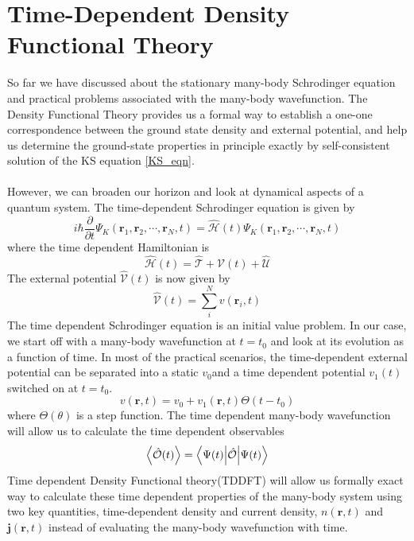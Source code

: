 \section{Time-Dependent Density Functional Theory}
So far we have discussed about the stationary many-body Schrodinger equation and practical problems associated with the many-body wavefunction. The Density Functional Theory provides us a formal way to establish a one-one correspondence between the ground state density and external potential, and help us determine the ground-state properties in principle exactly by self-consistent solution of the KS equation \eqref{KS_eqn}. \\ \\ 
However, we can broaden our horizon and look at dynamical aspects of a quantum system. The time-dependent Schrodinger equation is given by \begin{equation}\label{td_schrodinger_eqn1}
    i\hbar \frac{\partial}{\partial t}\Psi_K(\mathbf{r}_1,\mathbf{r}_2,\cdots,\mathbf{r}_N,t) = \hat{\mathcal{H}}(t)\Psi_K(\mathbf{r}_1,\mathbf{r}_2,\cdots,\mathbf{r}_N,t)
\end{equation}
where the time dependent Hamiltonian is 
\begin{equation}
    \hat{\mathcal{H}}(t) = \hat{\mathcal{T}} + \hat{\mathcal{V}}(t) + \hat{\mathcal{U}}
\end{equation}
The external potential $\hat{\mathcal{V}}(t)$ is now given by
\begin{equation}
    \hat{\mathcal{V}}(t) = \sum_i^{N}v(\mathbf{r}_i,t)
\end{equation}
The time dependent Schrodinger equation is an initial value problem. In our case, we start off with a many-body wavefunction at $t=t_0$ and look at its evolution as a function of time. In most of the practical scenarios, the time-dependent external potential can be separated into a static $v_0$and a time dependent potential $v_1(t)$ switched on at $t=t_0$. 
\begin{equation}
    v(\mathbf{r},t) = v_0 + v_1(\mathbf{r},t)\Theta(t-t_0)
\end{equation}
where $\Theta(\theta)$ is a step function. The time dependent many-body wavefunction will allow us to calculate the time dependent observables
\begin{equation}\label{td_expval}
    \expval{\hat{\mathcal{O}}(t)} = \ev**{\hat{\mathcal{O}}}{\Psi(t)}
\end{equation}
Time dependent Density Functional theory(TDDFT)\cite{tddft} will allow us formally exact  way to calculate these time dependent properties of the many-body system using two key quantities, time-dependent density and current density, $n(\mathbf{r},t)$ and $\mathbf{j}(\mathbf{r},t)$ instead of evaluating the many-body wavefunction with time. 
